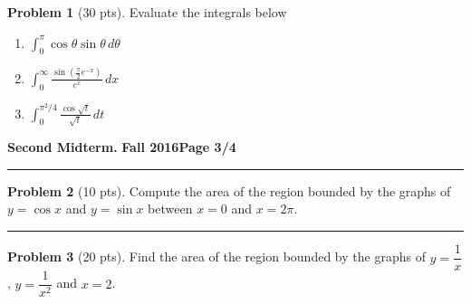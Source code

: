 \documentclass[12pt]{article}
\theoremstyle{definition}
\newtheorem{problem}{Problem}
\begin{document}
\bigskip
\begin{problem}[30 pts]
Evaluate the integrals below

\begin{enumerate}
\item $\displaystyle{\int_0^{\pi} \cos \theta  \sin \theta\, d\theta}$
\vspace{1.5cm}
\begin{flushright}
\end{flushright}

\item $\displaystyle{\int_0^{\infty} \frac{ \sin ( \tfrac{\pi}{2} e^{-x}) }{e^x} \, dx}$
\vspace{2.5cm}
\begin{flushright}
\end{flushright}
\item $\displaystyle{\int_0^{\pi^2/4} \frac{\cos \sqrt{t}}{\sqrt{t}}\, dt}$
\vspace{5cm}
\begin{flushright}
\end{flushright}
\end{enumerate}
\end{problem}
\newpage

\hfill{\large\bf Second Midterm.}\hfill{\large\bf
  Fall 2016}\hfill{\large\bf Page 3/4}\hrule

\bigskip
\begin{problem}[10 pts]
Compute the area of the region bounded by the graphs of $y=\cos x$ and $y=\sin x$ between $x=0$ and $x=2\pi$.
\vspace{8.5cm}
\begin{flushright}
\end{flushright}
\end{problem}
\hrule
\begin{problem}[20 pts]
Find the area of the region bounded by the graphs of $y=\dfrac{1}{x}$, $y=\dfrac{1}{x^2}$ and $x=2$.
\vspace{8.5cm}
\begin{flushright}
\end{flushright}
\end{problem}
\newpage
\end{document}
